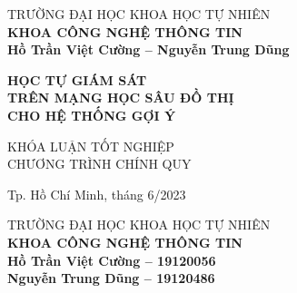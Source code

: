 \begin{titlepage}

\begin{center}
TRƯỜNG ĐẠI HỌC KHOA HỌC TỰ NHIÊN\\
\textbf{KHOA CÔNG NGHỆ THÔNG TIN}\\[2cm]


{ \Large \bfseries Hồ Trần Việt Cường -- Nguyễn Trung Dũng\\[2cm] } 


{ \Large \bfseries HỌC TỰ GIÁM SÁT\\TRÊN MẠNG HỌC SÂU ĐỒ THỊ\\CHO HỆ THỐNG GỢI Ý\\[3cm]} 


\large KHÓA LUẬN TỐT NGHIỆP\\
\large CHƯƠNG TRÌNH CHÍNH QUY\\



\vfill
Tp. Hồ Chí Minh, tháng 6/2023

\end{center}

\pagebreak



\begin{center}

TRƯỜNG ĐẠI HỌC KHOA HỌC TỰ NHIÊN\\
\textbf{KHOA CÔNG NGHỆ THÔNG TIN}\\[2cm]


{\large \bfseries Hồ Trần Việt Cường -- 19120056\\} 
{\large \bfseries Nguyễn Trung Dũng -- 19120486\\[2cm]}


\end{center}
\end{titlepage}
